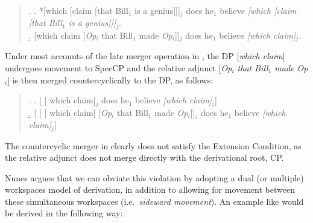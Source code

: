 \singlespacing
\begin{quote}
\ex.
\a. *[which [claim [that Bill$_{1}$ is a genius]]]$_{j}$ does he$_{1}$ believe {\it [which [claim [that Bill$_{1}$ is a genius]]]}$_{j}$.\\
\b. [which claim [{\it Op}$_{i}$ that Bill$_{1}$ made {\it Op}$_{i}$]]$_{j}$ does he$_{1}$ believe {\it [which claim]}$_{j}$.

\end{quote}
\onehalfspacing
Under most accounts of the late merger operation in \Last[b], the DP [{\it which claim}] undergoes movement to SpecCP and the relative adjunct [{\it Op$_{i}$ that Bill$_{1}$ made Op$_{i}$}] is then merged countercyclically to the DP, as follows:

\singlespacing
\begin{quote}
\ex.
\a. [ [ which claim]$_{j}$ does he$_{1}$ believe {\it [which claim]}$_{j}$]\\
\b. [ [ [ which claim] [{\it Op}$_{i}$ that Bill$_{1}$ made {\it Op}$_{i}$]]$_{j}$ does he$_{1}$ believe {\it [which claim]}$_{j}$]

\end{quote}
\onehalfspacing
The countercyclic merger in \Last[b] clearly does not satisfy the Extension Condition, as the relative adjunct does not merge directly with the derivational root, CP.

Nunes argues that we can obviate this violation by adopting a dual (or multiple) workspaces model of derivation, in addition to allowing for movement between these simultaneous workspaces (i.e.\ {\it sideward movement}). An example like \LLast[b] would be derived in the following way:

